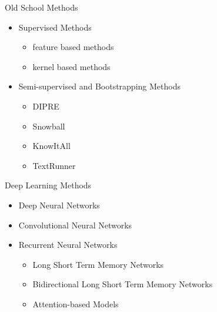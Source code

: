 \documentclass[xcolor={dvipsnames}]{beamer}
\begin{document}
\begin{frame}{\insertsection}

\begin{exampleblock}{Old School Methods}
		\begin{itemize}
			\item Supervised Methods
				\begin{itemize}
					\item feature based methods
					\item kernel based methods
				\end{itemize}
			\item Semi-supervised and Bootstrapping Methods
				\begin{itemize}
					\item DIPRE
					\item Snowball
					\item KnowItAll
					\item TextRunner
				\end{itemize}
			\end{itemize}
\end{exampleblock}
\end{frame}

\begin{frame}{\insertsection}

\begin{exampleblock}{Deep Learning Methods}
		\begin{itemize}
			\item Deep Neural Networks
			\item Convolutional Neural Networks
			\item Recurrent Neural Networks
				\begin{itemize}
					\item Long Short Term Memory Networks
					\item Bidirectional Long Short Term Memory Networks
					\item Attention-based Models
				\end{itemize}
			\end{itemize}
\end{exampleblock}
\end{frame}
\end{document}
